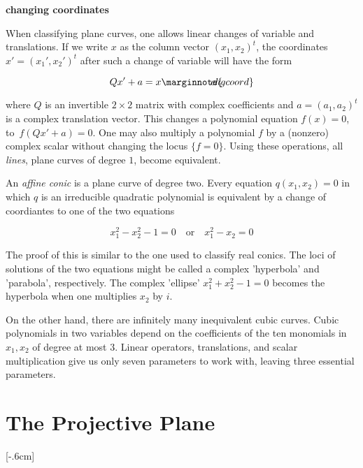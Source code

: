 \documentclass[leqno]{book}
\newcommand\Marginnote[1]{\marginnote{\hspace{-12pt}\normalfont{#1}}}
\renewcommand\theequation{\thesection.\arabic{equation}}
\newenvironment{boldequation}{\renewcommand\theequation{\textbf{\thesection.\arabic{equation}}}\equation}
   {\endequation}
\theoremstyle{definition}%
\numberwithin{equation}{section}
\theoremstyle{theorem} %
\begin{document}
\begin{boldequation}
\Marginnote{planecoords}\hspace{-9.5cm} \textbf {changing coordinates}
	\label{planecoords}
\end{boldequation}


When classifying plane curves, one allows linear
changes of variable and translations.  If we write $x$ as the column
vector $(x_1,x_2)^t$, the coordinates $x'= (x_1',x_2')^t$ after such a
change of variable will have the form

\begin{equation}
Qx'+a=x \Marginnote{chgcoord}
	\label{chgcoord}
\end{equation}

\no where $Q$ is an invertible $2\times 2$ matrix with complex
coefficients and $a= (a_1,a_2)^t$ is a complex translation vector.
This changes a polynomial equation $f(x)=0$, to $\,f(Qx'+a) = 0$.  One
may also multiply a polynomial $f$ by a (nonzero) complex scalar without
changing the locus $\{f=0\}$.  
Using these operations, all {\it
  lines}, plane curves of degree $1$, become equivalent.


\ms An {\it affine conic} is a plane curve of degree two.  Every equation
$q(x_1,x_2)=0$ in which $q$ is an irreducible quadratic polynomial is
equivalent by a change of coordiantes  to one of the two equations
 
\begin{equation}
x_1^2 - x_2^2 -1=0\quad\text{or}\quad 
x_1^2-x_2=0 
\end{equation} 

\no The proof of this is similar to the one used to classify real conics.
The loci of solutions of the two equations might be called a complex
'hyperbola' and 'parabola', respectively.  The complex 'ellipse'
$x_1^2+x_2^2-1=0$ becomes the hyperbola when one multiplies $x_2$ by
$i$.

 On the other hand, there are infinitely many inequivalent
cubic curves.  Cubic polynomials in two variables depend on the
coefficients of the ten monomials in $x_1,x_2$ of degree at most $3$.
Linear operators, translations, and scalar multiplication give us only
seven parameters to work with, leaving three essential parameters.

 
\section{The Projective Plane}\label{projplane}\Marginnote{projplane}[-.6cm]
\end{document}
